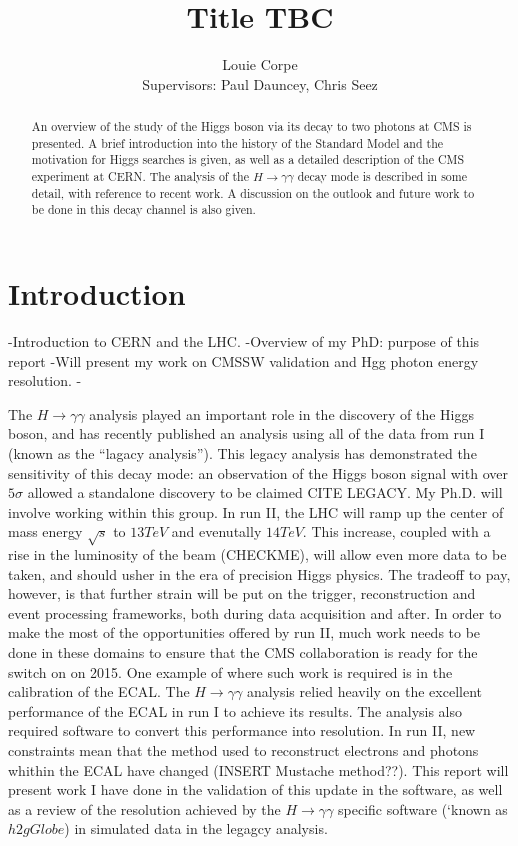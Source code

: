 \documentclass[10pt]{article}
\title{Title TBC}
\author{Louie Corpe \\Supervisors: Paul Dauncey, Chris Seez }
\begin{document}
\maketitle

\renewcommand{\abstractname}{Abstract}
\begin{abstract}
{\large
An overview of the study of the Higgs boson via its decay to two photons at CMS is presented. A brief introduction into the history of the Standard Model and the motivation for Higgs searches is given, as well as a detailed description of the CMS experiment at CERN. The analysis of the $H \rightarrow \gamma\gamma$ decay mode is described in some detail, with reference to recent work. A discussion on the outlook and future work to be done in this decay channel is also given.}
\end{abstract}



\tableofcontents

\newpage 
\section{Introduction}

-Introduction to CERN and the LHC.
-Overview of my PhD: purpose of this report
-Will present my work on CMSSW validation and Hgg photon energy resolution.
-

The $H \rightarrow \gamma \gamma$ analysis played an important role in the discovery of the Higgs boson, and has recently published an analysis using all of the data from run I (known as the ``lagacy analysis''). This legacy analysis has demonstrated the sensitivity of this decay mode: an observation of the Higgs boson signal with over $5 \sigma$ allowed a standalone discovery to be claimed CITE LEGACY. My Ph.D. will involve working within this group. In run II, the LHC will ramp up the center of mass energy $ \sqrt{s}$ to $13TeV$ and evenutally $14TeV$. This increase, coupled with a rise in the luminosity of the beam (CHECKME), will allow even more data to be taken, and should usher in the era of precision Higgs physics. The tradeoff to pay, however, is that further strain will be put on the trigger, reconstruction and event processing frameworks, both during data acquisition and after. In order to make the most of the opportunities offered by run II, much work needs to be done in these domains to ensure that the CMS collaboration is ready for the switch on on 2015. One example of where such work is required is in the calibration of the ECAL. The $H \rightarrow \gamma \gamma$ analysis relied heavily on the excellent performance of the ECAL in run I to achieve its results. The analysis also required software to convert this performance into resolution. In run II, new constraints mean that the method used to reconstruct electrons and photons whithin the ECAL have changed (INSERT Mustache method??). This report will present work I have done in the validation of this update in the software, as well as a review of the resolution achieved by the $H \rightarrow \gamma \gamma$ specific software (`known as $h2gGlobe$) in simulated data in the legagcy analysis.
\end{document}
